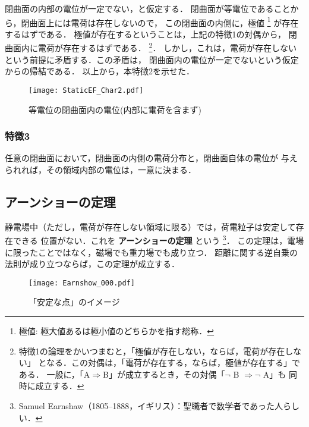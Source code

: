             閉曲面の内部の電位が一定でない，と仮定する．
            閉曲面が等電位であることから，閉曲面上には電荷は存在しないので，
            この閉曲面の内側に，極値
                \footnote{
                    極値: 極大値あるは極小値のどちらかを指す総称．
                }
            が存在するはずである．
            極値が存在するということは，上記の特徴1の対偶から，
            閉曲面内に電荷が存在するはずである．
                \footnote{
                    特徴1の論理をかいつまむと，「極値が存在しない，ならば，電荷が存在しない」
                    となる．この対偶は，「電荷が存在する，ならば，極値が存在する」である．
                    一般に，「A$\Rightarrow$B」が成立するとき，その対偶「$\lnot$ B $\Rightarrow\lnot$ A」も
                    同時に成立する．
                }．
            しかし，これは，電荷が存在しないという前提に矛盾する．この矛盾は，
            閉曲面内の電位が一定でないという仮定からの帰結である．
            以上から，本特徴2を示せた．
                \begin{figure}[hbt]
                    \begin{center}
                        \texttt{[image: StaticEF\_Char2.pdf]}
                        \caption{等電位の閉曲面内の電位(内部に電荷を含まず)}
                        \label{fig:StaticEF_Char2}
                    \end{center}
                \end{figure}


        \subsubsection{特徴3}\label{subsubsec:char3}
            任意の閉曲面において，閉曲面の内側の電荷分布と，閉曲面自体の電位が
            与えられれば，その領域内部の電位は，一意に決まる．

        \subsection{アーンショーの定理}
        静電場中（ただし，電荷が存在しない領域に限る）では，荷電粒子は安定して存在できる
        位置がない．これを \textbf{アーンショーの定理} という
            \footnote{
                Samuel Earnshaw（1805--1888，イギリス）：聖職者で数学者であった人らしい．
            }．
        この定理は，電場に限ったことではなく，磁場でも重力場でも成り立つ．
        距離に関する逆自乗の法則が成り立つならば，この定理が成立する．
                \begin{figure}[hbt]
                    \begin{center}
                        \texttt{[image: Earnshow\_000.pdf]}
                        \caption{「安定な点」のイメージ}
                        \label{fig:Earnshow_000}
                    \end{center}
                \end{figure}

